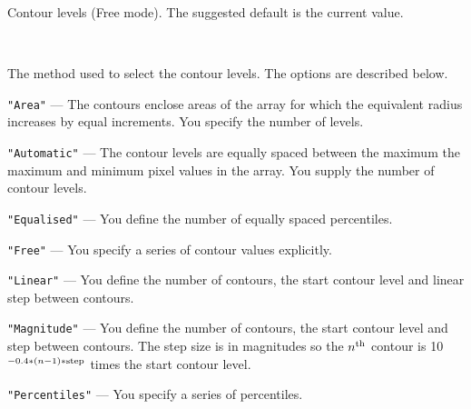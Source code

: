\documentclass[twoside,11pt]{article}
\newcommand{\sstsubsection}[1]{ \item[{#1}] \mbox{} \\}
\newcommand{\sstsubsection}[1]{\item[{#1}]}
\begin{document}
{{{      }{
         Contour levels (Free mode).  The suggested default is the
         current value.
      }
      \sstsubsection{
         MODE = LITERAL (Read)
      }{
         The method used to select the contour levels.  The options are
         described below.
         \begin{description}
         \item {\tt "Area"} --- The contours enclose areas of the array for
                         which the equivalent radius increases by equal
                         increments.  You specify the number of levels.
         \item {\tt "Automatic"} --- The contour levels are equally spaced between the maximum
                        the maximum and minimum pixel values in the
                        array.  You supply the number of contour levels.
         \item {\tt "Equalised"} --- You define the number of equally spaced
                          percentiles.
         \item {\tt "Free"} --- You specify a series of contour values
                        explicitly.
         \item {\tt "Linear"} --- You define the number of contours, the start
                        contour level and linear step between contours.
         \item {\tt "Magnitude"} --- You define the number of contours, the start
                        contour level and step between contours.  The
                        step size is in magnitudes so the $n^{\rm th}$
                        contour is 10$^{-0.4*(n-1)*{\rm step}}$ times the
                        start contour level.
         \item {\tt "Percentiles"} --- You specify a series of percentiles.
         \end{description}

}}}
\end{document}
